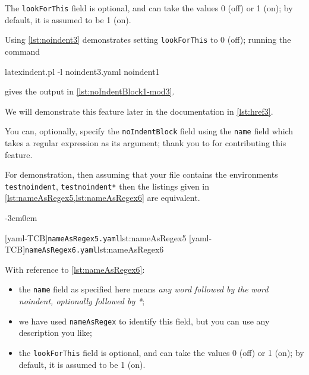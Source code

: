 \documentclass[10pt]{article}
\newenvironment{widepage}{\begin{adjustwidth}{-3cm}{0cm}}{\end{adjustwidth}}
\begin{document}
 The \texttt{lookForThis} field is optional, and can take the values 0 (off) or 1 (on);
 by default, it is assumed to be 1 (on).

 \begin{example}
 Using \cref{lst:noindent3} demonstrates setting \texttt{lookForThis} to 0 (off); running
 the command

 \begin{commandshell}
latexindent.pl -l noindent3.yaml noindent1
\end{commandshell}

 gives the output in \cref{lst:noIndentBlock1-mod3}.


 \end{example}

 We will demonstrate this feature later in the documentation in \cref{lst:href3}.

 You can, optionally, specify  the
 \texttt{noIndentBlock} field using the \texttt{name} field which takes a regular
 expression as its argument; thank you to \cite{XuehaiPan} for contributing this feature.

 \begin{example}
 For demonstration, then assuming that your file contains the environments
 \texttt{testnoindent}, \texttt{testnoindent*} then the listings given in
 \cref{lst:nameAsRegex5,lst:nameAsRegex6} are equivalent.

 \begin{widepage}
  \begin{cmhtcbraster}[raster column skip=.1\linewidth]
   [yaml-TCB]{\texttt{nameAsRegex5.yaml}}{lst:nameAsRegex5}
   [yaml-TCB]{\texttt{nameAsRegex6.yaml}}{lst:nameAsRegex6}
  \end{cmhtcbraster}
 \end{widepage}

 With reference to \cref{lst:nameAsRegex6}:
 \begin{itemize}
  \item the \texttt{name} field as specified here means \emph{any word followed by the
        word noindent, optionally followed by *};
  \item we have used \texttt{nameAsRegex} to identify this field, but you can use any
        description you like;
  \item the \texttt{lookForThis} field is optional, and can take the values 0 (off) or 1
        (on); by default, it is assumed to be 1 (on).
 \end{itemize}
 \end{example}
\end{document}
